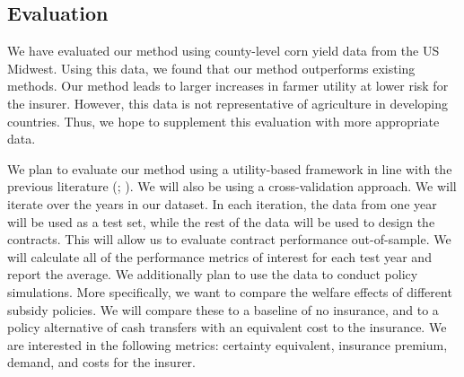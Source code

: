 \documentclass[12pt]{article}
\begin{document}
  \subsection{Evaluation}
  We have evaluated our method using county-level corn yield data from the US Midwest. Using this data, we found that our method outperforms existing methods. Our method leads to larger increases in farmer utility at lower risk for the insurer. However, this data is not representative of agriculture in developing countries. Thus, we hope to supplement this evaluation with more appropriate data. \par
  We plan to evaluate our method using a utility-based framework in line with the previous literature (\cite{clarke2016theory}; \cite{flatnes2018improving}). We will also be using a cross-validation approach. We will iterate over the years in our dataset. In each iteration, the data from one year will be used as a test set, while the rest of the data will be used to design the contracts. This will allow us to evaluate contract performance out-of-sample. We will calculate all of the performance metrics of interest for each test year and report the average.  We additionally plan to use the data to conduct policy simulations. More specifically, we want to compare the welfare effects of different subsidy policies. We will compare these to a baseline of no insurance, and to a policy alternative of cash transfers with an equivalent cost to the insurance. We are interested in the following metrics: certainty equivalent, insurance premium, demand, and costs for the insurer.
 


\end{document}
